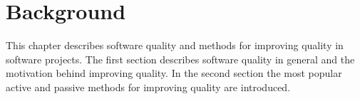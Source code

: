 
 \chapter{Background}
 
This chapter describes software quality and methods for improving quality in software projects. The first section describes software quality in general and the motivation behind improving quality. In the second section the most popular active and passive methods for improving quality are introduced.

 


